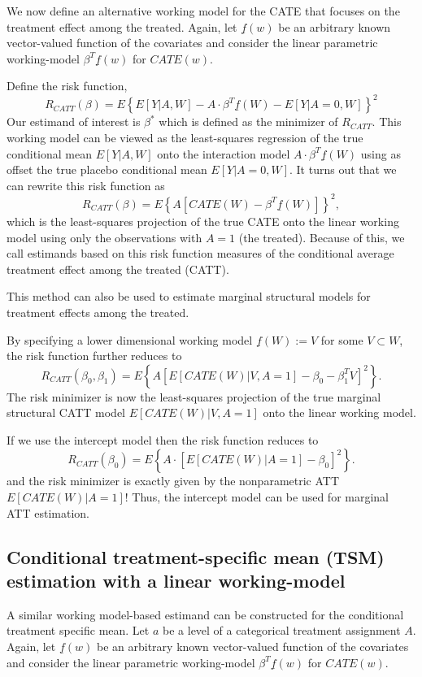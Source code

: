 \documentclass{article}
\begin{document}
We now define an alternative working model for the CATE that focuses on the treatment effect among the treated. Again, let $\underline{f}(w)$ be an arbitrary known vector-valued function of the covariates and consider the linear parametric working-model $\beta^T \underline{f}(w)$ for $CATE(w)$. 

Define the risk function,
$$R_{CATT}(\beta) = E \left\{E[Y|A,W] - A \cdot \beta^T \underline{f}(W) - E[Y|A=0,W]\right\}^2$$
Our estimand of interest is $\beta^*$ which is defined as the minimizer of $R_{CATT}$. This working model can be viewed as the least-squares regression of the true conditional mean $E[Y|A,W]$ onto the interaction model $A \cdot \beta^T \underline{f}(W) $ using as offset the true placebo conditional mean $E[Y|A=0,W]$. It turns out that we can rewrite this risk function as 
$$R_{CATT}(\beta) = E \left\{A \left[CATE(W) - \beta^T \underline{f}(W)  \right]  \right\}^2,$$
which is the least-squares projection of the true CATE onto the linear working model using only the observations with $A=1$ (the treated). Because of this, we call estimands based on this risk function measures of the conditional average treatment effect among the treated (CATT).

This method can also be used to estimate marginal structural models for treatment effects among the treated.

By specifying a lower dimensional working model $\underline{f}(W) := V$ for some $V \subset W$, the risk function further reduces to
$$R_{CATT}(\beta_0, \beta_1) = E \left\{A\left[E[CATE(W)|V,A=1] - \beta_0 - \beta_1^T V\right]^2 \right\}.$$
The risk minimizer is now the least-squares projection of the true marginal structural CATT model $E[CATE(W)|V, A=1]$ onto the linear working model.


If we use the intercept model then the risk function reduces to
$$R_{CATT}(\beta_0) = E \left\{ A\cdot \left[E[CATE(W)|A=1] - \beta_0 \right]^2 \right\}.$$
and the risk minimizer is exactly given by the nonparametric ATT $E[CATE(W)|A=1]$! Thus, the intercept model can be used for marginal ATT estimation.

 


\subsection{Conditional treatment-specific mean (TSM) estimation with a linear working-model}
A similar working model-based estimand can be constructed for the conditional treatment specific mean. Let $a$ be a level of a categorical treatment assignment $A$. Again, let $\underline{f}(w)$ be an arbitrary known vector-valued function of the covariates and consider the linear parametric working-model $\beta^T \underline{f}(w)$ for $CATE(w)$. 
\end{document}
